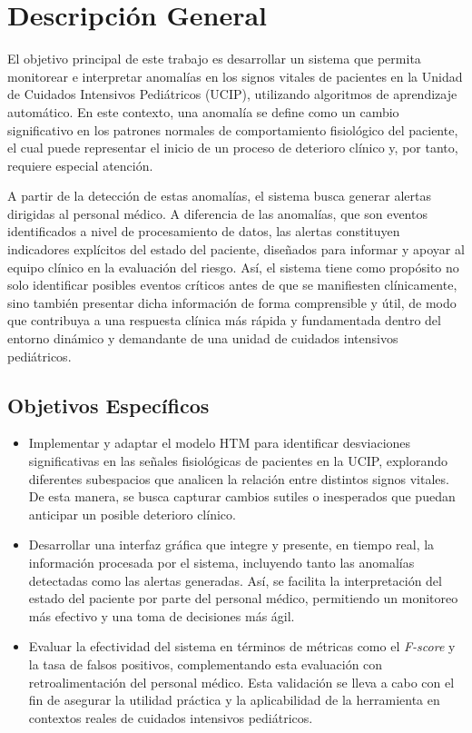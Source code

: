 \chapter{Descripción General}


El objetivo principal de este trabajo es desarrollar un sistema que permita monitorear e interpretar anomalías en los signos vitales de pacientes en la Unidad de Cuidados Intensivos Pediátricos (UCIP), utilizando algoritmos de aprendizaje automático. En este contexto, una anomalía se define como un cambio significativo en los patrones normales de comportamiento fisiológico del paciente, el cual puede representar el inicio de un proceso de deterioro clínico y, por tanto, requiere especial atención.  

A partir de la detección de estas anomalías, el sistema busca generar alertas dirigidas al personal médico. A diferencia de las anomalías, que son eventos identificados a nivel de procesamiento de datos, las alertas constituyen indicadores explícitos del estado del paciente, diseñados para informar y apoyar al equipo clínico en la evaluación del riesgo. Así, el sistema tiene como propósito no solo identificar posibles eventos críticos antes de que se manifiesten clínicamente, sino también presentar dicha información de forma comprensible y útil, de modo que contribuya a una respuesta clínica más rápida y fundamentada dentro del entorno dinámico y demandante de una unidad de cuidados intensivos pediátricos.

\medskip


\section{Objetivos Específicos}

\begin{itemize}
    \item Implementar y adaptar el modelo HTM para identificar desviaciones significativas en las señales fisiológicas de pacientes en la UCIP, explorando diferentes subespacios que analicen la relación entre distintos signos vitales. De esta manera, se busca capturar cambios sutiles o inesperados que puedan anticipar un posible deterioro clínico.
    
    \item  Desarrollar una interfaz gráfica que integre y presente, en tiempo real, la información procesada por el sistema, incluyendo tanto las anomalías detectadas como las alertas generadas. Así, se facilita la interpretación del estado del paciente por parte del personal médico, permitiendo un monitoreo más efectivo y una toma de decisiones más ágil.
    
    \item  Evaluar la efectividad del sistema en términos de métricas como el \textit{F-score} y la tasa de falsos positivos, complementando esta evaluación con retroalimentación del personal médico. Esta validación se lleva a cabo con el fin de asegurar la utilidad práctica y la aplicabilidad de la herramienta en contextos reales de cuidados intensivos pediátricos.
    
\end{itemize}

